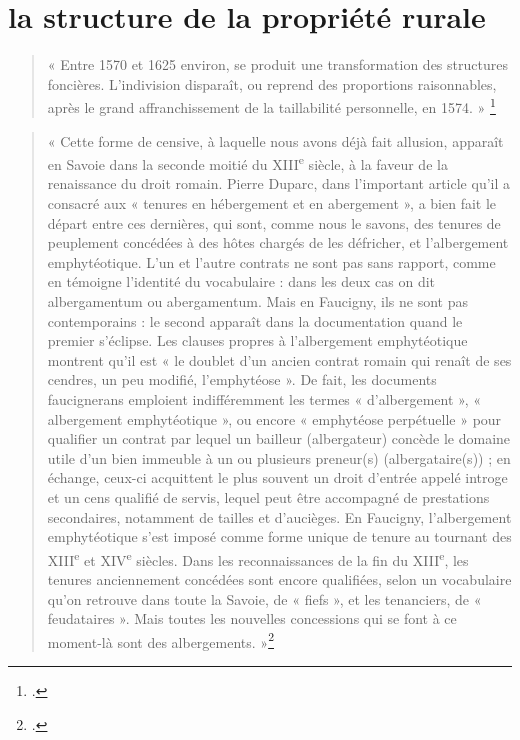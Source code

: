 \documentclass[12pt,a4paper]{report}
\begin{document}
\section{la structure de la propriété rurale}


\begin{quote}
	« Entre 1570 et 1625 environ, se produit une transformation des structures foncières. L'indivision disparaît, ou reprend des proportions raisonnables, après le grand affranchissement de la taillabilité personnelle, en 1574. »
	\footcite[92]{HViallet1993}
\end{quote}

\begin{quote}
	« Cette forme de censive, à laquelle nous avons déjà fait allusion, apparaît en Savoie dans la seconde moitié du XIII\textsuperscript{e} siècle, à la faveur de la renaissance du droit romain. Pierre Duparc, dans l’important article qu’il a consacré aux « tenures en hébergement et en abergement », a bien fait le départ entre ces dernières, qui sont, comme nous le savons, des tenures de peuplement concédées à des hôtes chargés de les défricher, et l’albergement emphytéotique. L’un et l’autre contrats ne sont pas sans rapport, comme en témoigne l’identité du vocabulaire : dans les deux cas on dit albergamentum ou abergamentum. Mais en Faucigny, ils ne sont pas contemporains : le second apparaît dans la documentation quand le premier s’éclipse. Les clauses propres à l’albergement emphytéotique montrent qu’il est « le doublet d’un ancien contrat romain qui renaît de ses cendres, un peu modifié, l’emphytéose ». De fait, les documents faucignerans emploient indifféremment les termes « d’albergement », « albergement emphytéotique », ou encore « emphytéose perpétuelle » pour qualifier un contrat par lequel un bailleur (albergateur) concède le domaine utile d’un bien immeuble à un ou plusieurs preneur(s) (albergataire(s)) ; en échange, ceux-ci acquittent le plus souvent un droit d’entrée appelé introge et un cens qualifié de servis, lequel peut être accompagné de prestations secondaires, notamment de tailles et d’aucièges. En Faucigny, l’albergement emphytéotique s’est imposé comme forme unique de tenure au tournant des XIII\textsuperscript{e} et XIV\textsuperscript{e} siècles. Dans les reconnaissances de la fin du XIII\textsuperscript{e}, les tenures anciennement concédées sont encore qualifiées, selon un vocabulaire qu’on retrouve dans toute la Savoie, de « fiefs », et les tenanciers, de « feudataires ». Mais toutes les nouvelles concessions qui se font à ce moment-là sont des albergements. »\footcite[308]{Carrier2001VieMontagnardeFaucigny}
\end{quote}	
\end{document}
